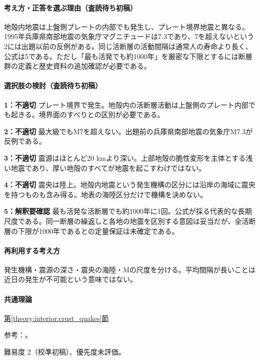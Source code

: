 \paragraph{考え方・正答を選ぶ理由（査読待ち初稿）} 地殻内地震は上盤側プレートの内部でも発生し、プレート境界地震と異なる。1995年兵庫県南部地震の気象庁マグニチュードは7.3であり、7を超えないという2には出題以前の反例がある。同じ活断層の活動間隔は通常人の寿命より長く、公式は5である。ただし「最も活発でも約1000年」を厳密な下限とするには断層群の定義と歴史資料の追加確認が必要である。

\paragraph{選択肢の検討（査読待ち初稿）}\mbox{}\par

\noindent\textbf{1：不適切} プレート境界で発生。地殻内の活断層活動は上盤側のプレート内部でも起きる。境界面のすべりとの区別が必要である。\par

\noindent\textbf{2：不適切} 最大級でもM7を超えない。出題前の兵庫県南部地震の気象庁M7.3が反例である。\par

\noindent\textbf{3：不適切} 震源はほとんど20 kmより深い。上部地殻の脆性変形を主体とする浅い地震であり、厚い地殻のすべてが地震を起こすわけではない。\par

\noindent\textbf{4：不適切} 震央は陸上。地殻内地震という発生機構の区分には沿岸の海域に震央を持つものも含み得る。地表の海陸区分だけで機構を決めない。\par

\noindent\textbf{5：解釈要確認} 最も活発な活断層でも約1000年に1回。公式が採る代表的な長期尺度である。同一断層の繰返しと各地の地震を区別する意図は妥当だが、全活断層の下限が1000年であるとの定量保証は未確定である。\par

\paragraph{再利用する考え方} 発生機構・震源の深さ・震央の海陸・Mの尺度を分ける。平均間隔が長いことは近日の発生が不可能という意味ではない。

\paragraph{共通理論} \hyperref[theory:interior:crust_quakes]{第\ref*{theory:interior:crust_quakes}節}

\par 参考：\cite{jma_hyogo_history,herp_longterm_intervals}。

\par 難易度 2（校準初稿）、優先度未評価。
